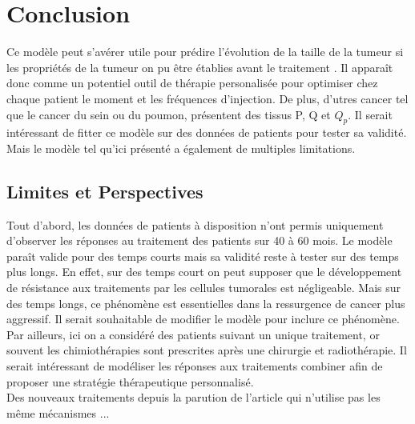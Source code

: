 \documentclass[12pt,a4paper]{article}
\begin{document}
\section{Conclusion}
Ce modèle peut s'avérer utile pour prédire l'évolution de la taille de la tumeur si les propriétés de la tumeur on pu être établies avant le traitement \cite{}. Il apparaît donc comme un potentiel outil de thérapie personalisée pour optimiser chez chaque patient le moment et les fréquences d'injection.  De plus, d'utres cancer tel que le cancer du sein ou du poumon, présentent des tissus P, Q et $Q_{p}$. Il serait intéressant de fitter ce modèle sur des données de patients pour tester sa validité. Mais le modèle tel qu'ici présenté a également de multiples limitations. 
\subsection{Limites et Perspectives}
Tout d'abord, les données de patients à disposition n'ont permis uniquement d'observer les réponses au traitement des patients sur 40 à 60 mois.  Le modèle paraît valide pour des temps courts mais sa validité reste à tester sur des temps plus longs. En effet, sur des temps court on peut supposer que le développement de résistance aux traitements par les cellules tumorales est négligeable. Mais sur des temps longs, ce phénomène est essentielles dans la ressurgence de cancer plus aggressif. Il serait souhaitable de modifier le modèle pour inclure ce phénomène. \\
Par ailleurs, ici on a considéré des patients suivant un unique traitement, or souvent les chimiothérapies sont prescrites après une chirurgie et radiothérapie. Il serait intéressant de modéliser les réponses aux traitements combiner afin de proposer une stratégie thérapeutique personnalisé.\\
Des nouveaux traitements depuis la parution de l'article qui n'utilise pas les même mécanismes ... 
\end{document}

